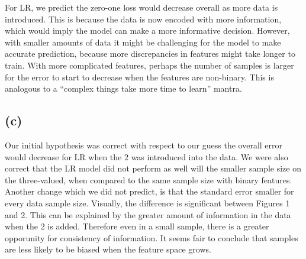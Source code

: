 \documentclass[11pt]{article}
\begin{document}
For LR, we predict the zero-one loss would decrease overall as more data is introduced. This is because the data is now encoded with more information, which would imply the model can make a more informative decision. However, with smaller amounts of data it might be challenging for the model to make accurate prediction, because more discrepancies in features might take longer to train. With more complicated features, perhaps the number of samples is larger for the error to start to decrease when the features are non-binary. This is analogous to a ``complex things take more time to learn'' mantra.

\subsection*{(c)}

Our initial hypothesis was correct with respect to our guess the overall error would decrease for LR when the $2$ was introduced into the data. We were also correct that the LR model did not perform as well will the smaller sample size on the three-valued, when compared to the same sample size with binary features.
Another change which we did not predict, is that the standard error smaller for every data sample size. Visually, the difference is significant between Figures 1 and 2. This can be explained by the greater amount of information in the data when the $2$ is added. Therefore even in a small sample, there is a greater opporunity for consistency of information. It seems fair to conclude that samples are less likely to be biased when the feature space grows.
\end{document}
